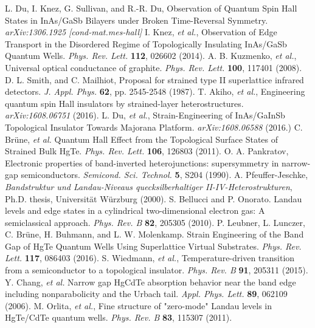 \documentclass[titlepage,a4paper]{book}
\begin{document}
\begin{thebibliography}{99}
L. Du, I. Knez, G. Sullivan, and R.-R. Du, Observation of Quantum Spin Hall States in InAs/GaSb Bilayers under Broken Time-Reversal Symmetry. \textit{arXiv:1306.1925 [cond-mat.mes-hall]}
 I. Knez, \textit{et al.}, Observation of Edge Transport in the Disordered Regime of Topologically Insulating InAs/GaSb Quantum Wells. \textit{Phys. Rev. Lett.} \textbf{112}, 026602 (2014).
A. B. Kuzmenko, \textit{et al.}, Universal optical conductance of graphite. \textit{Phys. Rev. Lett.} \textbf{100}, 117401 (2008).
D. L. Smith, and C. Mailhiot, Proposal for strained type II superlattice infrared detectors. \textit{J. Appl. Phys.} \textbf{62}, pp. 2545-2548 (1987). 
T. Akiho, \textit{et al.}, Engineering quantum spin Hall insulators by strained-layer heterostructures. \textit{arXiv:1608.06751} (2016).
L. Du, \textit{et al.}, Strain-Engineering of InAs/GaInSb Topological Insulator Towards Majorana Platform. \textit{arXiv:1608.06588} (2016.)
C. Brüne, \textit{et al.} Quantum Hall Effect from the Topological Surface States of Strained Bulk HgTe. \textit{Phys. Rev. Lett.} \textbf{106}, 126803 (2011).
O. A. Pankratov, Electronic properties of band-inverted heterojunctions: supersymmetry in narrow-gap semiconductors. \textit{Semicond. Sci. Technol.} \textbf{5}, S204 (1990).
A. Pfeuffer-Jeschke, \textit{Bandstruktur und Landau-Niveaus quecksilberhaltiger II-IV-Heterostrukturen}, Ph.D. thesis, Universität Würzburg (2000).
S. Bellucci and P. Onorato. Landau levels and edge states in a cylindrical two-dimensional electron gas: A semiclassical approach. \textit{Phys. Rev. B} \textbf{82}, 205305 (2010).
P. Leubner, L. Lunczer, C. Brüne, H. Buhmann, and L. W. Molenkamp. Strain Engineering of the Band Gap of HgTe Quantum Wells Using Superlattice Virtual Substrates. \textit{Phys. Rev. Lett.} \textbf{117}, 086403 (2016).
S. Wiedmann, \textit{et al.}, Temperature-driven transition from a semiconductor to a topological insulator. \textit{Phys. Rev. B} \textbf{91}, 205311 (2015).
Y. Chang, \textit{et al.} Narrow gap HgCdTe absorption behavior near the band edge including nonparabolicity and the Urbach tail. \textit{Appl. Phys. Lett.} \textbf{89}, 062109 (2006).
M. Orlita, \textit{et al.}, Fine structure of "zero-mode" Landau levels in HgTe/CdTe quantum wells. \textit{Phys. Rev. B} \textbf{83}, 115307 (2011).

\end{thebibliography}
\end{document}
